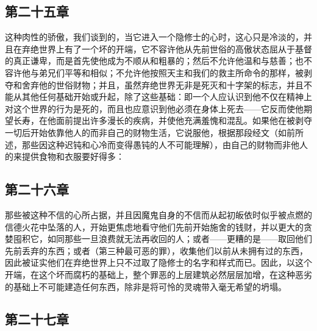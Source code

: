 
\subsection{第二十五章}

\par

这种肉性的骄傲，我们谈到的，当它进入一个隐修士的心时，这心只是冷淡的，并且在弃绝世界上有了一个坏的开端，它不容许他从先前世俗的高傲状态屈从于基督的真正谦卑，而是首先使他成为不顺从和粗暴的；然后不允许他温和与慈善；也不容许他与弟兄们平等和相似；不允许他按照天主和我们的救主所命令的那样，被剥夺和舍弃他的世俗财物；并且，虽然弃绝世界无非是死灭和十字架的标志，并且不能从其他任何基础开始或升起，除了这些基础：即一个人应认识到他不仅在精神上对这个世界的行为是死的，而且也应意识到他必须在身体上死去——它反而使他期望长寿，在他面前提出许多漫长的疾病，并使他充满羞愧和混乱。如果他在被剥夺一切后开始依靠他人的而非自己的财物生活，它说服他，根据那段经文（如前所述，那些因这种迟钝和心冷而变得愚钝的人不可能理解），由自己的财物而非他人的来提供食物和衣服要好得多：\par


\subsection{第二十六章}

\par

那些被这种不信的心所占据，并且因魔鬼自身的不信而从起初皈依时似乎被点燃的信德火花中坠落的人，开始更焦虑地看守他们先前开始施舍的钱财，并以更大的贪婪囤积它，如同那些一旦浪费就无法再收回的人；或者——更糟的是——取回他们先前丢弃的东西；或者（第三种最可恶的罪），收集他们以前从未拥有过的东西，因此被证实他们在弃绝世界上只不过取了隐修士的名字和样式而已。因此，以这个开端，在这个坏而腐朽的基础上，整个罪恶的上层建筑必然层层加增，在这种恶劣的基础上不可能建造任何东西，除非是将可怜的灵魂带入毫无希望的坍塌。\par


\subsection{第二十七章}

